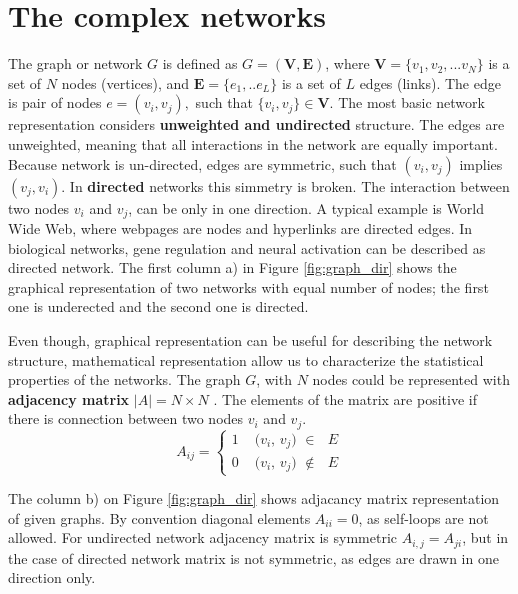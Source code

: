 
\section{The complex networks}

The graph or network $G$ is defined as $G=(\boldsymbol{V}, \boldsymbol{E})$, where $\boldsymbol{V} = \{ v_1, v_2, ... v_N\}$ is a set of $N$ nodes (vertices), and  $\boldsymbol{E} = \{e_1, .. e_L\}$ is a set of $L$ edges (links). The edge is pair of nodes $e = (v_i, v_j), $ such that $\{v_i,v_j\}\in \boldsymbol{V}$. The most basic network representation considers \textbf{unweighted and undirected} structure. The edges are unweighted, meaning that all interactions in the network are equally important.  Because network is un-directed, edges are symmetric, such that $(v_i, v_j)$ implies $(v_j, v_i)$. In \textbf{directed} networks this simmetry is broken. The interaction between two nodes $v_i$ and $v_j$, can be only in one direction. A typical example is World Wide Web, where webpages are nodes and hyperlinks are directed edges. In biological networks, gene regulation and neural activation can be described as directed network. The first column a) in Figure \ref{fig:graph_dir} shows the graphical representation of two networks with equal number of nodes; the first one is underected and the second one is directed. 

Even though, graphical representation can be useful for describing the network structure, mathematical representation allow us to characterize the statistical properties of the networks. The graph $G$, with $N$ nodes could be represented with \textbf{adjacency matrix} $|A| = N \times N$ \cite{boccaletti2006complex}. The elements of the matrix are positive if there is connection between two nodes $v_i$ and $v_j$. 
\begin{equation}
A_{ij} =
\begin{cases}
1 & \text{ ($v_i$, $v_j$) $\in$ $E$}\\
0 & \text{ ($v_i$, $v_j$) $\notin$ $E$}
\end{cases}       
\end{equation}

The column b) on Figure \ref{fig:graph_dir} shows adjacancy matrix representation of given graphs. By convention diagonal elements $A_{ii}=0$, as self-loops are not allowed. For undirected network adjacency matrix is symmetric $A_{i,j}=A_{ji}$, but in the case of directed network matrix is not symmetric, as edges are drawn in one direction only.  

